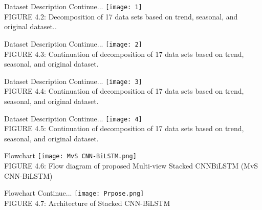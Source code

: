\documentclass[12pt, aspectratio=169]{beamer}
\begin{document}
\begin{frame}{Dataset Description \tiny{Continue...}}
	\centering
	\texttt{[image: 1]}\\ 
	\scriptsize{FIGURE 4.2: Decomposition of 17 data sets based on trend, seasonal, and original dataset..}
\end{frame}

\begin{frame}{Dataset Description \tiny{Continue...}}
	\centering
	\texttt{[image: 2]}\\
	\scriptsize{FIGURE 4.3: Continuation of decomposition of 17 data sets based on trend, seasonal, and original dataset.}
\end{frame}

\begin{frame}{Dataset Description \tiny{Continue...}}
	\centering
	\texttt{[image: 3]}\\
	\scriptsize{FIGURE 4.4: Continuation of decomposition of 17 data sets based on trend, seasonal, and original dataset.}
\end{frame}

\begin{frame}{Dataset Description \tiny{Continue...}}
	\centering
	\texttt{[image: 4]}\\
	\scriptsize{FIGURE 4.5: Continuation of decomposition of 17 data sets based on trend, seasonal, and original dataset.}
\end{frame}


\begin{frame}{Flowchart}
	\centering
	\texttt{[image: MvS CNN-BiLSTM.png]}\\
	\scriptsize{FIGURE 4.6: Flow diagram of proposed Multi-view Stacked CNNBiLSTM (MvS CNN-BiLSTM)}
\end{frame}
\begin{frame}{Flowchart  \tiny{Continue...}}
	\centering
	\texttt{[image: Prpose.png]}\\
	\scriptsize{FIGURE 4.7: Architecture of Stacked CNN-BiLSTM}
\end{frame}
\end{document}
